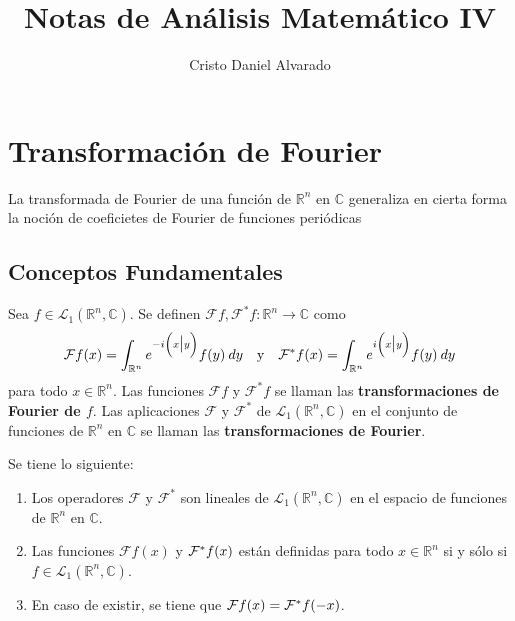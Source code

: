 \documentclass[12pt]{report}
\theoremstyle{largebreak}
\newcommand\cf[3]{\ensuremath{#1:#2\rightarrow#3}}
\newcommand\pint[2]{\ensuremath{\left(#1\big| #2\right)}}
\newcommand{\fou}[1]{\ensuremath{\mathcal{F}#1}}
\begin{document}
    \setlength{\parskip}{5pt} %
    \setlength{\parindent}{12pt} %
    \title{Notas de Análisis Matemático IV}
    \author{Cristo Daniel Alvarado}
    \maketitle

    \tableofcontents %

    
    \chapter{Transformación de Fourier}
    
    La transformada de Fourier de una función de $\mathbb{R}^n$ en $\mathbb{C}$ generaliza en cierta forma la noción de coeficietes de Fourier de funciones periódicas
    
    \section{Conceptos Fundamentales}

    \begin{mydef}
        Sea $f\in\mathcal{L}_1(\mathbb{R}^n,\mathbb{C})$. Se definen $\cf{\mathcal{F}f,\mathcal{F}^*f}{\mathbb{R}^n}{\mathbb{C}} $ como
        \begin{equation*}
            \mathcal{F}f(x)=\int_{ \mathbb{R}^n}e^{ -i\pint{x}{y}}f(y)\:dy\quad\textup{y}\quad\mathcal{F}^*f(x)=\int_{ \mathbb{R}^n}e^{i\pint{x}{y}}f(y)\:dy
        \end{equation*}
        para todo $x\in\mathbb{R}^n$. Las funciones $\mathcal{F}f$ y $\mathcal{F}^*f$ se llaman las \textbf{transformaciones de Fourier de $f$}. Las aplicaciones $\mathcal{F}$ y $\mathcal{F}^*$ de $\mathcal{L}_1(\mathbb{R}^n,\mathbb{C})$ en el conjunto de funciones de $\mathbb{R}^n$ en $\mathbb{C}$ se llaman las \textbf{transformaciones de Fourier}.
    \end{mydef}

    \renewcommand{\theenumi}{\roman{enumi}}

    \begin{obs}
        Se tiene lo siguiente:
        \begin{enumerate}
            \item Los operadores $\mathcal{F}$ y $\mathcal{F}^*$ son lineales de $\mathcal{L}_1(\mathbb{R}^n,\mathbb{C})$ en el espacio de funciones de $\mathbb{R}^n$ en $\mathbb{C}$.
            \item Las funciones $\fou{f}(x)$ y $\fou^*{f}(x)$ están definidas para todo $x\in\mathbb{R}^n$ si y sólo si $f\in\mathcal{L}_1(\mathbb{R}^n,\mathbb{C})$.
            \item En caso de existir, se tiene que $\fou{f}(x)=\fou^*{f}(-x)$.
        \end{enumerate}
    \end{obs}
\end{document}
